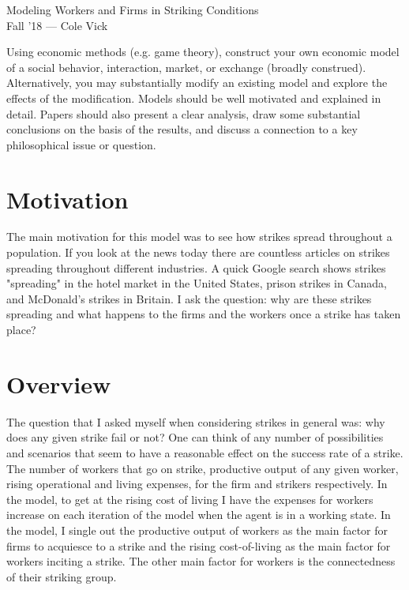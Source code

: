 \documentclass[11pt]{article}
\newcommand{\yourname}{Cole Vick}
\begin{document}
{\Large 
\begin{center}{Modeling Workers and Firms in Striking Conditions} \\Fall '18 --- \yourname \end{center}}


\vspace{15pt}

Using economic methods (e.g. game theory), construct your own economic model of a social behavior, interaction, market, or exchange (broadly construed). Alternatively, you may substantially modify an existing model and explore the effects of the modification. Models should be well motivated and explained in detail. Papers should also present a clear analysis, draw some substantial conclusions on the basis of the results, and discuss a connection to a key philosophical issue or question.

\section{Motivation}\hrulefill

The main motivation for this model was to see how strikes spread throughout a population. If you look at the news today there are countless articles on strikes spreading throughout different industries. A quick Google search shows strikes "spreading" in the hotel market in the United States, prison strikes in Canada, and McDonald's strikes in Britain. I ask the question: why are these strikes spreading and what happens to the firms and the workers once a strike has taken place?
\section{Overview} \hrulefill

The question that I asked myself when considering strikes in general was: why does any given strike fail or not? One can think of any number of possibilities and scenarios that seem to have a reasonable effect on the success rate of a strike. The number of workers that go on strike, productive output of any given worker, rising operational and living expenses, for the firm and strikers respectively. In the model, to get at the rising cost of living I have the expenses for workers increase on each iteration of the model when the agent is in a working state. In the model, I single out the productive output of workers as the main factor for firms to acquiesce to a strike and the rising cost-of-living as the main factor for workers inciting a strike. The other main factor for workers is the connectedness of their striking group.
\end{document}
